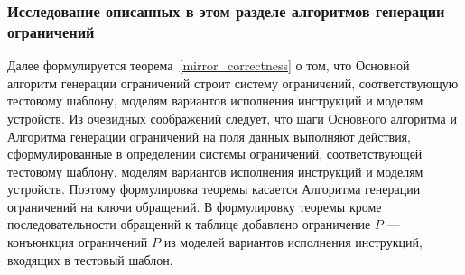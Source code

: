 \subsubsection*{Исследование описанных в этом разделе алгоритмов генерации ограничений}

Далее формулируется теорема~\ref{mirror_correctness} о том, что Основной алгоритм генерации ограничений строит систему ограничений, соответствующую тестовому шаблону, моделям вариантов исполнения инструкций и моделям устройств. Из очевидных соображений следует, что шаги Основного алгоритма и Алгоритма генерации ограничений на поля данных выполняют действия, сформулированные в определении системы ограничений, соответствующей тестовому шаблону, моделям вариантов исполнения инструкций и моделям устройств. Поэтому формулировка теоремы касается Алгоритма генерации ограничений на ключи обращений. В формулировку теоремы кроме последовательности обращений к таблице добавлено ограничение $P$ --- конъюнкция ограничений $P$ из моделей вариантов исполнения инструкций, входящих в тестовый шаблон.

